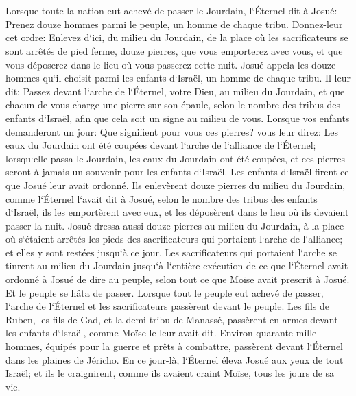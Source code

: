 \chapter{}

\verse Lorsque toute la nation eut achevé de passer le Jourdain, l`Éternel dit à Josué: 
\verse Prenez douze hommes parmi le peuple, un homme de chaque tribu. 
\verse Donnez-leur cet ordre: Enlevez d`ici, du milieu du Jourdain, de la place où les sacrificateurs se sont arrêtés de pied ferme, douze pierres, que vous emporterez avec vous, et que vous déposerez dans le lieu où vous passerez cette nuit. 
\verse Josué appela les douze hommes qu`il choisit parmi les enfants d`Israël, un homme de chaque tribu. 
\verse Il leur dit: Passez devant l`arche de l`Éternel, votre Dieu, au milieu du Jourdain, et que chacun de vous charge une pierre sur son épaule, selon le nombre des tribus des enfants d`Israël, 
\verse afin que cela soit un signe au milieu de vous. Lorsque vos enfants demanderont un jour: Que signifient pour vous ces pierres? 
\verse vous leur direz: Les eaux du Jourdain ont été coupées devant l`arche de l`alliance de l`Éternel; lorsqu`elle passa le Jourdain, les eaux du Jourdain ont été coupées, et ces pierres seront à jamais un souvenir pour les enfants d`Israël. 
\verse Les enfants d`Israël firent ce que Josué leur avait ordonné. Ils enlevèrent douze pierres du milieu du Jourdain, comme l`Éternel l`avait dit à Josué, selon le nombre des tribus des enfants d`Israël, ils les emportèrent avec eux, et les déposèrent dans le lieu où ils devaient passer la nuit. 
\verse Josué dressa aussi douze pierres au milieu du Jourdain, à la place où s`étaient arrêtés les pieds des sacrificateurs qui portaient l`arche de l`alliance; et elles y sont restées jusqu`à ce jour. 
\verse Les sacrificateurs qui portaient l`arche se tinrent au milieu du Jourdain jusqu`à l`entière exécution de ce que l`Éternel avait ordonné à Josué de dire au peuple, selon tout ce que Moïse avait prescrit à Josué. Et le peuple se hâta de passer. 
\verse Lorsque tout le peuple eut achevé de passer, l`arche de l`Éternel et les sacrificateurs passèrent devant le peuple. 
\verse Les fils de Ruben, les fils de Gad, et la demi-tribu de Manassé, passèrent en armes devant les enfants d`Israël, comme Moïse le leur avait dit. 
\verse Environ quarante mille hommes, équipés pour la guerre et prêts à combattre, passèrent devant l`Éternel dans les plaines de Jéricho. 
\verse En ce jour-là, l`Éternel éleva Josué aux yeux de tout Israël; et ils le craignirent, comme ils avaient craint Moïse, tous les jours de sa vie. 
